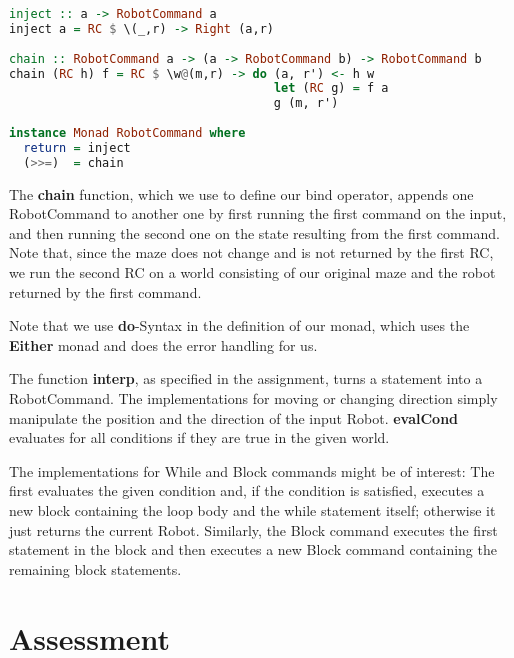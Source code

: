 \documentclass[a4paper]{article}
\begin{document}
\begin{lstlisting}[language=haskell]
inject :: a -> RobotCommand a
inject a = RC $ \(_,r) -> Right (a,r)
 
chain :: RobotCommand a -> (a -> RobotCommand b) -> RobotCommand b
chain (RC h) f = RC $ \w@(m,r) -> do (a, r') <- h w
                                     let (RC g) = f a
                                     g (m, r')
                                     
instance Monad RobotCommand where
  return = inject
  (>>=)  = chain
\end{lstlisting}
The \textbf{chain} function, which we use to define our bind operator, appends one RobotCommand to another one by first running the first command on the input, and then running the second one on the state resulting from the first command. Note that, since the maze does not change and is not returned by the first RC, we run the second RC on a world consisting of our original maze and the robot returned by the first command.

Note that we use \textbf{do}-Syntax in the definition of our monad, which uses the \textbf{Either} monad and does the error handling for us.

The function \textbf{interp}, as specified in the assignment, turns a statement into a RobotCommand. The implementations for moving or changing direction simply manipulate the position and the direction of the input Robot. \textbf{evalCond} evaluates for all conditions if they are true in the given world. 

The implementations for While and Block commands might be of interest: The first evaluates the given condition and, if the condition is satisfied, executes a new block containing the loop body and the while statement itself; otherwise it just returns the current Robot. Similarly, the Block command executes the first statement in the block and then executes a new Block command containing the remaining block statements.




\section{Assessment}
\end{document}
